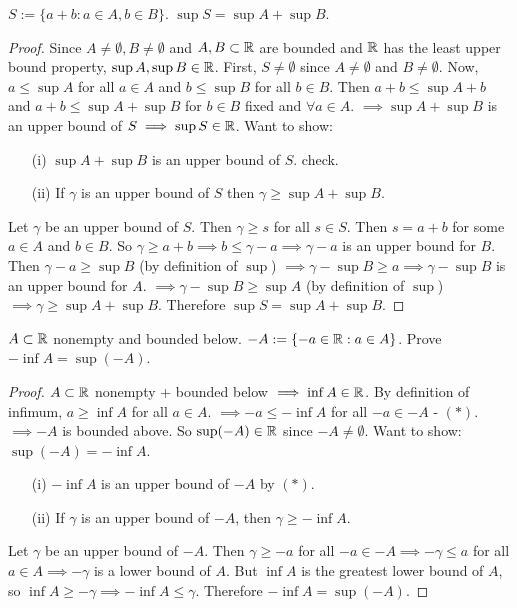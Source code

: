 \documentclass[]{article}
\begin{document}
\begin{example}
	[HW2.2] $S:=\{a+b:a\in A,b\in B\}$. $\sup S = \sup A + \sup B$.
	\begin{proof}
		Since $A\neq\emptyset,B\neq\emptyset$ and $A,B\subset \mathbb{R}$ are bounded and $\mathbb{R}$ has the least upper bound property, $\sup A,\sup B\in\mathbb{R}$.
		First, $S\neq\emptyset$ since $A\neq\emptyset$ and $B\neq\emptyset$. Now, $a\leq \sup A$ for all $a\in A$ and $b\leq \sup B$ for all $b\in B$.
		Then $a+b\leq\sup A+b$ and $a+b\leq \sup A + \sup B$ for $b\in B$ fixed and $\forall a\in A$. $\implies \sup A+\sup B$ is an upper bound of $S \implies \sup S\in\mathbb{R}$.
		Want to show:
		\begin{enumerate}
			\item[(i)] $\sup A+\sup B$ is an upper bound of $S$. check.
			\item[(ii)] If $\gamma$ is an upper bound of $S$ then $\gamma\geq\sup A + \sup B$.
		\end{enumerate}
		Let $\gamma$ be an upper bound of $S$. Then $\gamma\geq s$ for all $s\in S$. Then $s = a+b$ for some $a\in A$ and $b\in B$.
		So $\gamma \geq a+b \implies b\leq \gamma-a \implies \gamma-a$ is an upper bound for $B$.
		Then $\gamma-a\geq \sup B$ (by definition of $\sup$) $\implies \gamma-\sup B \geq a \implies \gamma-\sup B$ is an upper bound for $A$. $\implies \gamma-\sup B \geq \sup A$ (by definition of $\sup$) $\implies \gamma\geq \sup A + \sup B$.
		Therefore $\sup S = \sup A+\sup B$.
	\end{proof}
\end{example}
\begin{example}
	[HW2.3]
	$A\subset \mathbb{R}$ nonempty and bounded below. $-A:=\{-a\in \mathbb{R}:a\in A\}$.
	Prove $-\inf A = \sup (-A)$.
	\begin{proof}
		$A\subset\mathbb{R}$ nonempty + bounded below $\implies \inf A\in\mathbb{R}$.
		By definition of infimum, $a\geq \inf A$ for all $a\in A$.
		$\implies -a\leq -\inf A$ for all $-a\in -A$ - $(*)$.
		$\implies -A$ is bounded above. So $\sup (-A)\in\mathbb{R}$ since $-A\neq\emptyset$.
		Want to show: $\sup(-A) = -\inf A$.
		\begin{enumerate}
			\item[(i)] $-\inf A$ is an upper bound of $-A$ by $(*)$.
			\item[(ii)] If $\gamma$ is an upper bound of $-A$, then $\gamma\geq -\inf A$.
		\end{enumerate}
		Let $\gamma$ be an upper bound of $-A$. Then $\gamma\geq -a$ for all $-a\in -A \implies -\gamma\leq a$ for all $a\in A \implies -\gamma$ is a lower bound of $A$. But $\inf A$ is the greatest lower bound of $A$, so $\inf A\geq -\gamma \implies -\inf A\leq \gamma$. Therefore $-\inf A = \sup (-A)$.
	\end{proof}
\end{example}
\end{document}
